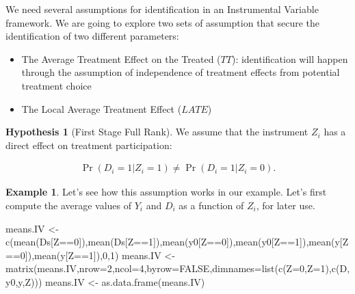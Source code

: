 \documentclass[
]{book}
\newenvironment{Shaded}{\begin{snugshade}}{\end{snugshade}}
\newcommand{\AttributeTok}[1]{\textcolor[rgb]{0.77,0.63,0.00}{#1}}
\newcommand{\ConstantTok}[1]{\textcolor[rgb]{0.00,0.00,0.00}{#1}}
\newcommand{\DecValTok}[1]{\textcolor[rgb]{0.00,0.00,0.81}{#1}}
\newcommand{\FunctionTok}[1]{\textcolor[rgb]{0.00,0.00,0.00}{#1}}
\newcommand{\NormalTok}[1]{#1}
\newcommand{\OtherTok}[1]{\textcolor[rgb]{0.56,0.35,0.01}{#1}}
\newcommand{\SpecialCharTok}[1]{\textcolor[rgb]{0.00,0.00,0.00}{#1}}
\newcommand{\StringTok}[1]{\textcolor[rgb]{0.31,0.60,0.02}{#1}}
\providecommand{\tightlist}{%
  \setlength{\itemsep}{0pt}\setlength{\parskip}{0pt}}
\theoremstyle{definition}
\theoremstyle{definition}
\newtheorem{example}{Example}[chapter]
\theoremstyle{definition}
\theoremstyle{definition}
\newtheorem{hypothesis}{Hypothesis}[chapter]
\theoremstyle{remark}
\begin{document}
We need several assumptions for identification in an Instrumental Variable framework.
We are going to explore two sets of assumption that secure the identification of two different parameters:

\begin{itemize}
\tightlist
\item
  The Average Treatment Effect on the Treated (\(TT\)): identification will happen through the assumption of independence of treatment effects from potential treatment choice
\item
  The Local Average Treatment Effect (\(LATE\))
\end{itemize}

\begin{hypothesis}[First Stage Full Rank]
\protect\hypertarget{hyp:FirstStage}{}{\label{hyp:FirstStage} \iffalse (First Stage Full Rank) \fi{} }We assume that the instrument \(Z_i\) has a direct effect on treatment participation:

\begin{align*}
\Pr(D_i=1|Z_i=1)\neq\Pr(D_i=1|Z_i=0).
\end{align*}
\end{hypothesis}

\begin{example}
\protect\hypertarget{exm:unnamed-chunk-140}{}{\label{exm:unnamed-chunk-140} }Let's see how this assumption works in our example.
Let's first compute the average values of \(Y_i\) and \(D_i\) as a function of \(Z_i\), for later use.
\end{example}

\begin{Shaded}
\begin{Highlighting}[]
\NormalTok{means.IV }\OtherTok{\textless{}{-}} \FunctionTok{c}\NormalTok{(}\FunctionTok{mean}\NormalTok{(Ds[Z}\SpecialCharTok{==}\DecValTok{0}\NormalTok{]),}\FunctionTok{mean}\NormalTok{(Ds[Z}\SpecialCharTok{==}\DecValTok{1}\NormalTok{]),}\FunctionTok{mean}\NormalTok{(y0[Z}\SpecialCharTok{==}\DecValTok{0}\NormalTok{]),}\FunctionTok{mean}\NormalTok{(y0[Z}\SpecialCharTok{==}\DecValTok{1}\NormalTok{]),}\FunctionTok{mean}\NormalTok{(y[Z}\SpecialCharTok{==}\DecValTok{0}\NormalTok{]),}\FunctionTok{mean}\NormalTok{(y[Z}\SpecialCharTok{==}\DecValTok{1}\NormalTok{]),}\DecValTok{0}\NormalTok{,}\DecValTok{1}\NormalTok{)}
\NormalTok{means.IV }\OtherTok{\textless{}{-}} \FunctionTok{matrix}\NormalTok{(means.IV,}\AttributeTok{nrow=}\DecValTok{2}\NormalTok{,}\AttributeTok{ncol=}\DecValTok{4}\NormalTok{,}\AttributeTok{byrow=}\ConstantTok{FALSE}\NormalTok{,}\AttributeTok{dimnames=}\FunctionTok{list}\NormalTok{(}\FunctionTok{c}\NormalTok{(}\StringTok{\textquotesingle{}Z=0\textquotesingle{}}\NormalTok{,}\StringTok{\textquotesingle{}Z=1\textquotesingle{}}\NormalTok{),}\FunctionTok{c}\NormalTok{(}\StringTok{\textquotesingle{}D\textquotesingle{}}\NormalTok{,}\StringTok{\textquotesingle{}y0\textquotesingle{}}\NormalTok{,}\StringTok{\textquotesingle{}y\textquotesingle{}}\NormalTok{,}\StringTok{\textquotesingle{}Z\textquotesingle{}}\NormalTok{)))}
\NormalTok{means.IV }\OtherTok{\textless{}{-}} \FunctionTok{as.data.frame}\NormalTok{(means.IV)}
\end{Highlighting}
\end{Shaded}
\end{document}
